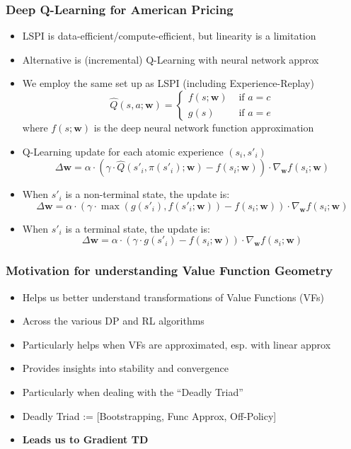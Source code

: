 \documentclass[handout]{beamer}
\begin{document}
\begin{frame}
\frametitle{Deep Q-Learning for American Pricing}
\pause
\begin{itemize}[<+->]
\item LSPI is data-efficient/compute-efficient, but linearity is a limitation
\item Alternative is (incremental) Q-Learning with neural network approx
\item We employ the same set up as LSPI (including Experience-Replay)
$$
\hat{Q}(s,a; \bm{w}) =
\begin{cases}
f(s;\bm{w}) & \text{ if } a = c \\
g(s) & \text{ if } a = e
\end{cases}
$$
where $f(s; \bm{w})$ is the deep neural network function approximation
\item Q-Learning update for each atomic experience $(s_i,s'_i)$
$$\Delta \bm{w} = \alpha \cdot (\gamma \cdot \hat{Q}(s'_i, \pi(s'_i); \bm{w}) - f(s_i;\bm{w})) \cdot \nabla_{\bm{w}} f(s_i;\bm{w})$$
\item When $s'_i$ is a non-terminal state, the update is:
$$\Delta \bm{w} =  \alpha \cdot (\gamma \cdot \max(g(s'_i), f(s'_i;\bm{w})) - f(s_i;\bm{w})) \cdot \nabla_{\bm{w}} f(s_i;\bm{w})$$
\item When $s'_i$ is a terminal state, the update is:
$$\Delta \bm{w} = \alpha \cdot (\gamma \cdot g(s'_i) - f(s_i;\bm{w})) \cdot \nabla_{\bm{w}} f(s_i;\bm{w})$$
\end{itemize}
\end{frame}

\begin{frame}
\frametitle{Motivation for understanding Value Function Geometry}
\pause
\begin{itemize}[<+->]
\item Helps us better understand transformations of Value Functions (VFs)
\item Across the various DP and RL algorithms
\item Particularly helps when VFs are approximated, esp. with linear approx
\item Provides insights into stability and convergence
\item Particularly when dealing with the ``Deadly Triad''
\item Deadly Triad := [Bootstrapping, Func Approx, Off-Policy]
\item {\bf Leads us to Gradient TD}
\end{itemize}
\end{frame}
\end{document}
